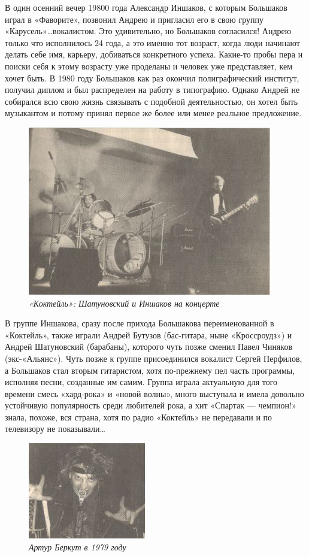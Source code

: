 \documentclass[16pt,a5paper,oneside]{book}
\begin{document}
В один осенний вечер 19800 года Александр Иншаков, с которым Большаков играл в «Фаворите», позвонил Андрею и пригласил
его в свою группу «Карусель»\ldots вокалистом. Это удивительно, но Большаков согласился! Андрею только что исполнилось
24 года, а это именно тот возраст, когда люди начинают делать себе имя, карьеру, добиваться конкретного успеха. Какие-то
пробы пера и поиски себя к этому возрасту уже проделаны и человек уже представляет, кем хочет быть. В 1980 году
Большаков как раз окончил полиграфический институт, получил диплом и был распределен на работу в типографию. Однако
Андрей не собирался всю свою жизнь связывать с подобной деятельностью, он хотел быть музыкантом и потому принял первое
же более или менее реальное предложение.

\begin{figure}
    \centering
    \includegraphics[scale=0.8]{Image06}
    \caption{\textit{«Коктейль»: Шатуновский и Иншаков на концерте}}
\end{figure}

В группе Иншакова, сразу после прихода Большакова переименованной в «Коктейль», также играли Андрей Бутузов (бас-гитара,
ныне «Кроссроудз») и Андрей Шатуновский (барабаны), которого чуть позже сменил Павел Чиняков (экс-«Альянс»). Чуть позже
к группе присоединился вокалист Сергей Перфилов, а Большаков стал вторым гитаристом, хотя по-прежнему пел часть
программы, исполняя песни, созданные им самим. Группа играла актуальную для того времени смесь «хард-рока» и «новой
волны», много выступала и имела довольно устойчивую популярность среди любителей рока, а хит «Спартак — чемпион!» знала,
похоже, вся страна, хотя по радио «Коктейль» не передавали и по телевизору не показывали\ldots

\begin{figure}
    \centering
    \includegraphics[scale=0.9]{Image07}
    \caption{\textit{Артур Беркут в 1979 году}}
\end{figure}
\end{document}
